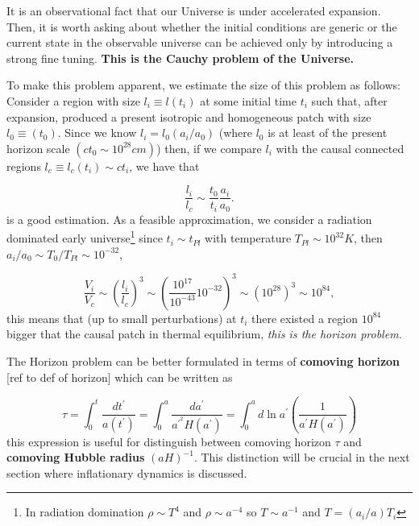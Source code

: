 \documentclass[12pt,letterpaper,twoside]{book}
\begin{document}
It is an observational fact that our Universe is under accelerated
expansion. Then, it is worth asking about whether the initial conditions are
generic or the current state in the observable universe can be achieved only
by introducing a strong fine tuning. \textbf{This is the Cauchy problem of the
    Universe.}

To make this problem apparent, we estimate the size of this problem as follows:
Consider a region with size $l_i \equiv l(t_i)$ at some initial time $t_i$ such
that, after expansion, produced a present isotropic and homogeneous patch with
size $l_0\equiv(t_0)$.  Since we know $l_i=l_0 (a_i/a_0)$ (where $l_0$ is at
least of the present horizon scale $( ct_0\sim 10^{28} cm)$) then, if we compare
$l_i$ with the causal connected regions $ l_c \equiv  l_c(t_i) \sim ct_i$, we
have that

\begin{equation}
    \frac{l_i}{l_c}\sim \frac{t_0}{t_i} \frac{a_i}{a_0}.
\end{equation}
is a good estimation. As a feasible approximation, we consider a radiation
dominated early universe\footnote{In radiation domination $\rho \sim T^4$ and
    $\rho \sim a^{-4}$ so $T\sim a^{-1}$ and $T=(a_i/a)T_i $} since $t_i\sim
t_{Pl}$  with temperature $T_{Pl}\sim10^{32} K$, then $a_i/a_0\sim
T_0/T_{Pl}\sim 10^{-32}$,

\begin{equation} \frac{V_i}{V_c} \sim \left(\frac{l_i}{l_c}\right)^3 \sim \left(
        \frac{10^{17}}{10^{-43}}10^{-32} \right)^3 \sim \left(10^{28}\right)^3
    \sim 10^{84},
\end{equation}
this means that (up to small perturbations) at $t_i$ there existed a region
$10^{84}$ bigger that the causal patch in thermal equilibrium, \textit{this is
    the horizon problem.}

The Horizon problem can be better formulated in terms of \textbf{comoving
    horizon} [ref to def of horizon]  which can be written as

 \begin{equation}
      \tau= \int_0^t  \frac{d t^\prime}{a(t^\prime) } =
      \int_0^a  \frac{d a^\prime}{a^{\prime^2} H \left( a^\prime\right)} =
      \int_0^a d \ln a^\prime \left(\frac{1}{a^\prime H\left( a^\prime\right)}\right)
 \end{equation}
%
 this expression is useful for distinguish between comoving horizon $\tau$ and
\textbf{comoving Hubble radius} $(aH)^{-1}$. This distinction will be crucial in
the next section where inflationary dynamics is discussed.
\end{document}
